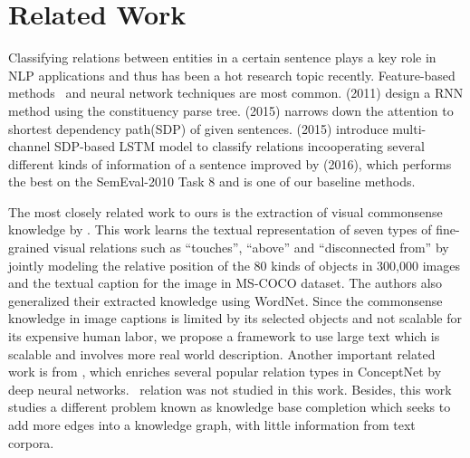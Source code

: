 \section{Related Work}
Classifying relations between entities in a certain sentence plays a key role in NLP applications and thus has been a hot research topic recently.
Feature-based methods~\cite{sem} and neural network techniques are most common. 
\citeauthor{socher2011semi}(2011) design a RNN method using the constituency parse tree. \citeauthor{ebrahimi2015chain} (2015) narrows down the attention to shortest dependency path(SDP) of given sentences. 
\citeauthor{xu2015classifying}(2015) introduce multi-channel  SDP-based LSTM model to classify relations incooperating several different kinds of information of a sentence improved by \citeauthor{xu2016improved}(2016), which performs the best on the SemEval-2010 Task 8 and is one of our baseline methods.

The most closely related work to ours is the extraction of
visual commonsense knowledge by \citeauthor{yatskar2016stating}. 
This work learns the textual representation of seven types of fine-grained 
visual relations such as ``touches'', ``above'' and ``disconnected from'' 
by jointly modeling the relative position of the 80 kinds of objects in 300,000 images
and the textual caption for the image in MS-COCO dataset\cite{lin2014microsoft}. 
The authors also generalized their extracted knowledge using WordNet. 
Since the commonsense knowledge in image captions is limited by its selected objects and not scalable for its expensive human labor, we propose a framework to use large text which is scalable and involves more real world description. 
Another important related work is from \citeauthor{li2016commonsense}, which enriches
several popular relation types in ConceptNet by deep neural networks.
\lnear~relation was not studied in this work. Besides, this work studies
a different problem known as knowledge base completion which seeks to
add more edges into a knowledge graph, with little information from
text corpora. 
